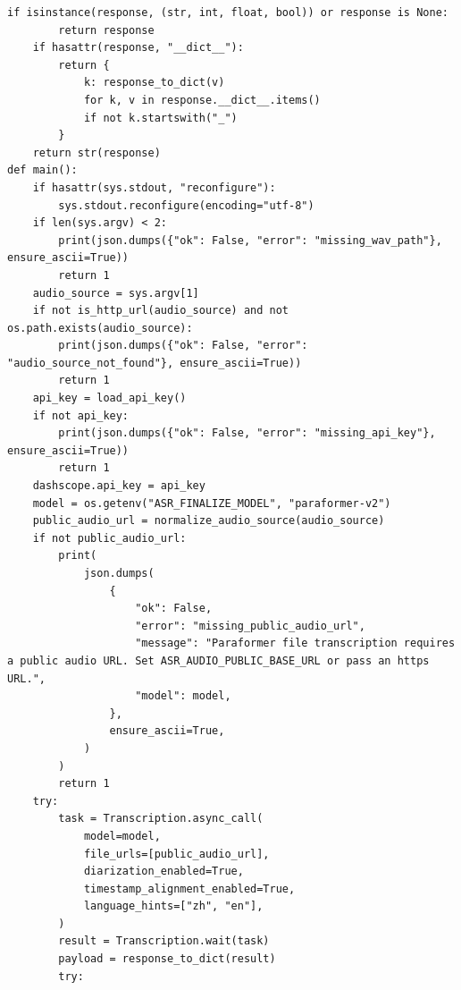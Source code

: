 \documentclass[12pt,a4paper]{article}
\begin{document}
\begin{Verbatim}[fontsize=\footnotesize]
    if isinstance(response, (str, int, float, bool)) or response is None:
        return response
    if hasattr(response, "__dict__"):
        return {
            k: response_to_dict(v)
            for k, v in response.__dict__.items()
            if not k.startswith("_")
        }
    return str(response)
def main():
    if hasattr(sys.stdout, "reconfigure"):
        sys.stdout.reconfigure(encoding="utf-8")
    if len(sys.argv) < 2:
        print(json.dumps({"ok": False, "error": "missing_wav_path"}, ensure_ascii=True))
        return 1
    audio_source = sys.argv[1]
    if not is_http_url(audio_source) and not os.path.exists(audio_source):
        print(json.dumps({"ok": False, "error": "audio_source_not_found"}, ensure_ascii=True))
        return 1
    api_key = load_api_key()
    if not api_key:
        print(json.dumps({"ok": False, "error": "missing_api_key"}, ensure_ascii=True))
        return 1
    dashscope.api_key = api_key
    model = os.getenv("ASR_FINALIZE_MODEL", "paraformer-v2")
    public_audio_url = normalize_audio_source(audio_source)
    if not public_audio_url:
        print(
            json.dumps(
                {
                    "ok": False,
                    "error": "missing_public_audio_url",
                    "message": "Paraformer file transcription requires a public audio URL. Set ASR_AUDIO_PUBLIC_BASE_URL or pass an https URL.",
                    "model": model,
                },
                ensure_ascii=True,
            )
        )
        return 1
    try:
        task = Transcription.async_call(
            model=model,
            file_urls=[public_audio_url],
            diarization_enabled=True,
            timestamp_alignment_enabled=True,
            language_hints=["zh", "en"],
        )
        result = Transcription.wait(task)
        payload = response_to_dict(result)
        try:
\end{Verbatim}
\newpage
{}
\fancyhead[R]{}
\end{document}
